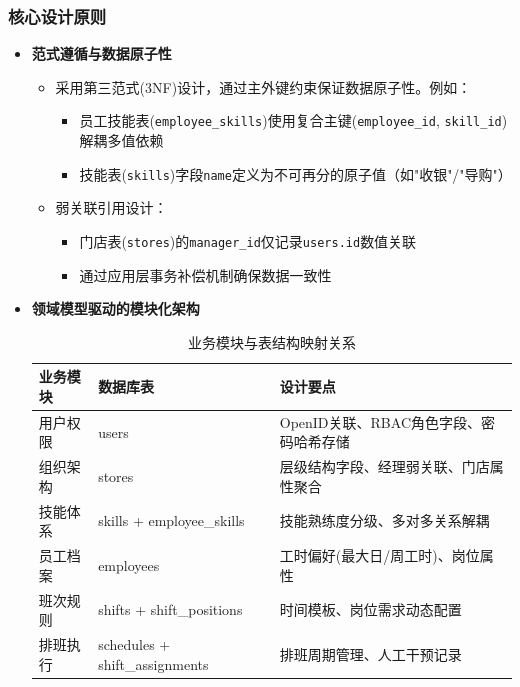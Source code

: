 \documentclass{ctexart}
\begin{document}
\subsubsection{核心设计原则}
\begin{itemize}
    \item \textbf{范式遵循与数据原子性}
    \begin{itemize}
        \item 采用第三范式(3NF)设计，通过主外键约束保证数据原子性。例如：
        \begin{itemize}
            \item 员工技能表(\texttt{employee\_skills})使用复合主键(\texttt{employee\_id}, \texttt{skill\_id})解耦多值依赖
            \item 技能表(\texttt{skills})字段\texttt{name}定义为不可再分的原子值（如"收银"/"导购"）
        \end{itemize}
        
        \item 弱关联引用设计：
        \begin{itemize}
            \item 门店表(\texttt{stores})的\texttt{manager\_id}仅记录\texttt{users.id}数值关联
            \item 通过应用层事务补偿机制确保数据一致性
        \end{itemize}
    \end{itemize}

    \item \textbf{领域模型驱动的模块化架构}
    \begin{table}[H]
        \centering
        \caption{业务模块与表结构映射关系}
        \label{tab:db-modules}
        \begin{tabularx}{\linewidth}{|l|l|X|}
        \hline
        \textbf{业务模块} & \textbf{数据库表} & \textbf{设计要点} \\ \hline
        用户权限 & users & OpenID关联、RBAC角色字段、密码哈希存储 \\ \hline
        组织架构 & stores & 层级结构字段、经理弱关联、门店属性聚合 \\ \hline
        技能体系 & skills + employee\_skills & 技能熟练度分级、多对多关系解耦 \\ \hline
        员工档案 & employees & 工时偏好(最大日/周工时)、岗位属性 \\ \hline
        班次规则 & shifts + shift\_positions & 时间模板、岗位需求动态配置 \\ \hline
        排班执行 & schedules + shift\_assignments & 排班周期管理、人工干预记录 \\ \hline
        \end{tabularx}
    \end{table}


\end{itemize}
\end{document}
